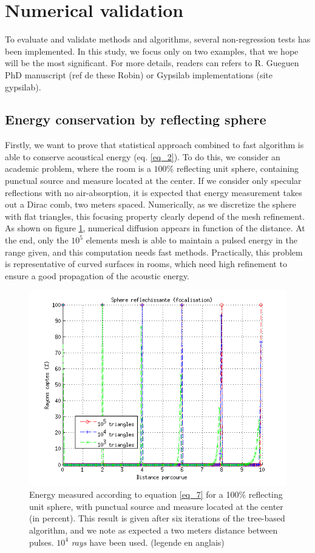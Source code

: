 \documentclass[AMA,STIX1COL]{WileyNJD-v2}
\begin{document}
\section{Numerical validation}
To evaluate and validate methods and algorithms, several non-regression tests has been implemented. In this study, we focus only on two examples, that we hope will be the most significant. For more details, readers can refers to R. Gueguen PhD manuscript (ref de these Robin) or Gypsilab implementations (site gypsilab).   

\subsection{Energy conservation by reflecting sphere}
Firstly, we want to prove that statistical approach combined to fast algorithm is able to conserve acoustical energy (eq. \ref{eq_2}). To do this, we consider an academic problem, where the room is a $100\%$ reflecting unit sphere, containing punctual source and measure located at the center. If we consider only specular reflections with no air-absorption, it is expected that energy measurement takes out a Dirac comb, two meters spaced.
Numerically, as we discretize the sphere with flat triangles, this focusing property clearly depend of the mesh refinement. As shown on figure \ref{test2RIR}, numerical diffusion appears in function of the distance.  At the end, only the $10^5$ elements mesh is able to maintain a pulsed energy in the range given, and this computation needs fast methods. Practically, this problem is representative of curved surfaces in rooms, which need high refinement to ensure a good propagation of the acoustic energy.

\begin{figure}[t]
\centering
		\includegraphics[width=0.6\linewidth]{sphere}
		\caption{Energy measured according to equation \ref{eq_7} for a 100\% reflecting unit sphere, with punctual source and measure located at the center (in percent). This result is given after six iterations of the tree-based algorithm, and we note as expected a two meters distance between pulses. $10^4$ \textit{rays} have been used. (legende en anglais)}
		\label{test2RIR}
\end{figure}
\end{document}
